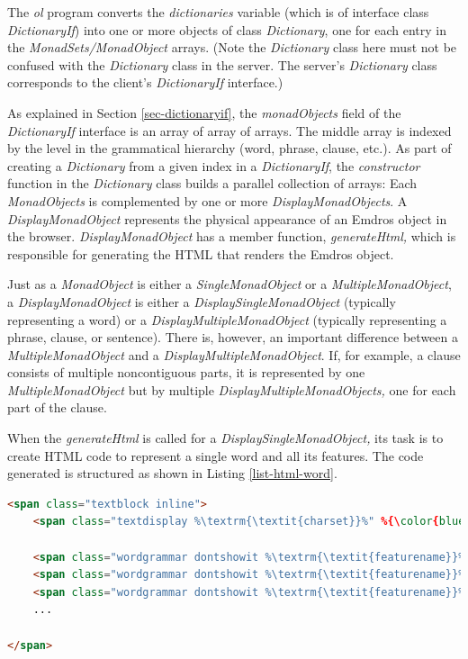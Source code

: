 \documentclass[11pt,oneside,a4paper]{memoir}
\begin{document}
The \emph{ol} program converts the \emph{dictionaries} variable (which is of interface class
\emph{DictionaryIf}) into one or more objects of class \emph{Dictionary}, one for each entry in the
\emph{MonadSets/MonadObject} arrays. (Note the \emph{Dictionary} class here must not be confused
with the \emph{Dictionary} class in the server. The server's \emph{Dictionary} class corresponds to
the client's \emph{DictionaryIf} interface.)

As explained in Section \ref{sec-dictionaryif}, the \emph{monadObjects} field of the
\emph{DictionaryIf} interface is an array of array of arrays. The middle array is indexed by the
level in the grammatical hierarchy (word, phrase, clause, etc.). As part of creating a
\emph{Dictionary} from a given index in a \emph{DictionaryIf}, the \emph{constructor} function in
the \emph{Dictionary} class builds a parallel collection of arrays: Each \emph{MonadObjects} is
complemented by one or more \emph{DisplayMonadObjects}. A \emph{DisplayMonadObject} represents the
physical appearance of an Emdros object in the browser. \emph{DisplayMonadObject} has a member
function, \emph{generateHtml,} which is responsible for generating the HTML that renders the Emdros
object.

Just as a \emph{MonadObject} is either a \emph{SingleMonadObject} or a \emph{MultipleMonadObject}, a
\emph{DisplayMonadObject} is either a \emph{DisplaySingleMonadObject} (typically representing a
word) or a \emph{DisplayMultipleMonadObject} (typically representing a phrase, clause, or sentence).
There is, however, an important difference between a \emph{MultipleMonadObject} and a
\emph{DisplayMultipleMonadObject}. If, for example, a clause consists of multiple noncontiguous
parts, it is represented by one \emph{MultipleMonadObject} but by multiple
\emph{DisplayMultipleMonadObjects,} one for each part of the clause.

When the \emph{generateHtml} is called for a \emph{DisplaySingleMonadObject,} its task is to create
HTML code to represent a single word and all its features. The code generated is structured as shown
in Listing \ref{list-html-word}.

\begin{lstlisting}[language=HTML,caption=HTML display structure for a word object,label=list-html-word]
<span class="textblock inline">
    <span class="textdisplay %\textrm{\textit{charset}}%" %{\color{blue} data-idd}%="%\textrm{\textit{ID\_D}}%">%\textrm{\textit{text}}%</span>

    <span class="wordgrammar dontshowit %\textrm{\textit{featurename}}% %\textrm{\textit{charset}}%">%\textrm{\textit{featurevalue}}%</span>
    <span class="wordgrammar dontshowit %\textrm{\textit{featurename}}% %\textrm{\textit{charset}}%">%\textrm{\textit{featurevalue}}%</span>
    <span class="wordgrammar dontshowit %\textrm{\textit{featurename}}% %\textrm{\textit{charset}}%">%\textrm{\textit{featurevalue}}%</span>
    ...
  
</span>
\end{lstlisting}
\end{document}
